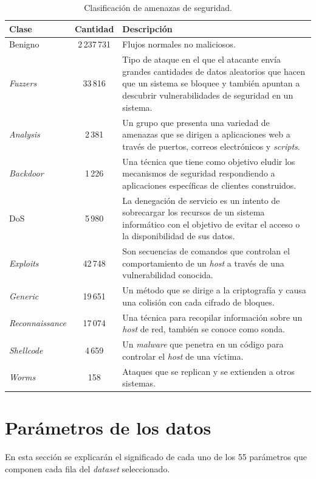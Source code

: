 \begin{table}[H]
\begin{tabular}{|l|c|>{\RaggedRight}p{10cm}|} %
\hline
\rowcolor[HTML]{C0C0C0} 
\textbf{Clase} & \textbf{Cantidad} & \textbf{Descripción} \\ \hline
Benigno & 2\,237\,731 & Flujos normales no maliciosos. \\ \hline
\textit{Fuzzers} & 33\,816 & Tipo de ataque en el que el atacante envía grandes cantidades de datos aleatorios que hacen que un sistema se bloquee y también apuntan a descubrir vulnerabilidades de seguridad en un sistema. \\ \hline
\textit{Analysis} & 2\,381 & Un grupo que presenta una variedad de amenazas que se dirigen a aplicaciones web a través de puertos, correos electrónicos y \textit{scripts}. \\ \hline
\textit{Backdoor} & 1\,226 & Una técnica que tiene como objetivo eludir los mecanismos de seguridad respondiendo a aplicaciones específicas de clientes construidos. \\ \hline
DoS & 5\,980 & La denegación de servicio es un intento de sobrecargar los recursos de un sistema informático con el objetivo de evitar el acceso o la disponibilidad de sus datos. \\ \hline
\textit{Exploits} & 42\,748 & Son secuencias de comandos que controlan el comportamiento de un \textit{host} a través de una vulnerabilidad conocida. \\ \hline
\textit{Generic} & 19\,651 & Un método que se dirige a la criptografía y causa una colisión con cada cifrado de bloques. \\ \hline
\textit{Reconnaissance} & 17\,074 & Una técnica para recopilar información sobre un \textit{host} de red, también se conoce como sonda. \\ \hline
\textit{Shellcode} & 4\,659 & Un \textit{malware} que penetra en un código para controlar el \textit{host} de una víctima. \\ \hline
\textit{Worms} & 158 & Ataques que se replican y se extienden a otros sistemas. \\ \hline
\end{tabular}
\centering
\caption{Clasificación de amenazas de seguridad.} 
\label{tab:attacks-tab}
\end{table}

\section{Parámetros de los datos} \label{sec.param-datos}
En esta sección se explicarán el significado de cada uno de los 55 parámetros que componen cada fila del \textit{dataset} seleccionado.

